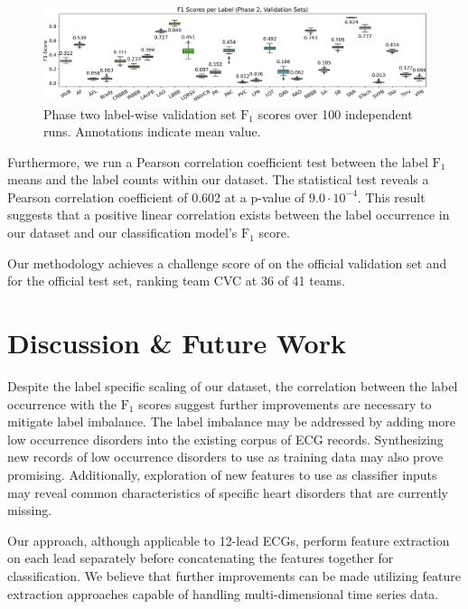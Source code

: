 \documentclass[\main/thesis.tex]{subfiles}
\begin{document}
\begin{figure}[ht]
  \centering
  \includegraphics[width=\textwidth]{figure/xgb_label_f1s.png}
  \caption[Manual feature engineering with gradient boosting decision tree label-wise $\text{F}_1$ scores on validation set.]{Phase two label-wise validation set $\text{F}_1$ scores over 100 independent runs. Annotations indicate mean value.}
  \label{fig:xgb_f1_score}
\end{figure}

Furthermore, we run a Pearson correlation coefficient test between the label $\text{F}_1$ means and the label counts within our dataset.
The statistical test reveals a Pearson correlation coefficient of 0.602 at a p-value of $9.0 \cdot 10^{-4}$.
This result suggests that a positive linear correlation exists between the label occurrence in our dataset and our classification model's $\text{F}_1$ score.

Our methodology achieves a challenge score of \officialvalscore on the official validation set and \officialtestscore for the official test set, ranking team CVC at 36 of 41 teams.

\section{Discussion \& Future Work}

Despite the label specific scaling of our dataset, the correlation between the label occurrence with the $\text{F}_1$ scores suggest further improvements are necessary to mitigate label imbalance.
The label imbalance may be addressed by adding more low occurrence disorders into the existing corpus of ECG records.
Synthesizing new records of low occurrence disorders to use as training data may also prove promising.
Additionally, exploration of new features to use as classifier inputs may reveal common characteristics of specific heart disorders that are currently missing.

Our approach, although applicable to 12-lead ECGs, perform feature extraction on each lead separately before concatenating the features together for classification.
We believe that further improvements can be made utilizing feature extraction approaches capable of handling multi-dimensional time series data.
\end{document}
